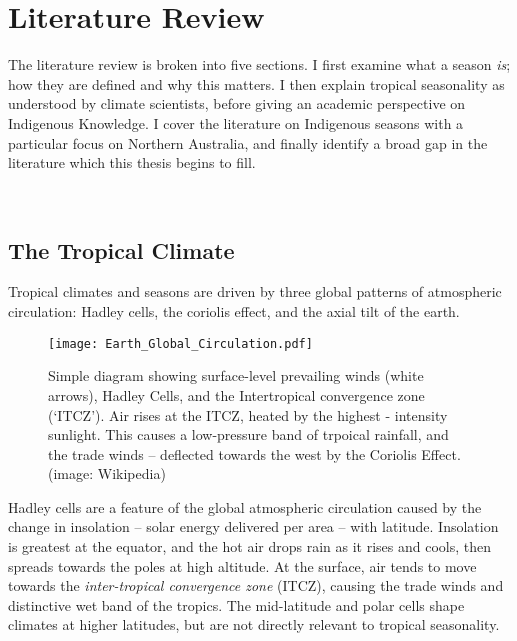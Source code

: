 \chapter{Literature Review}
\label{ch:lit-review}

The literature review is broken into five sections.  I first examine
what a season \emph{is}; how they are defined and why this matters.
I then explain tropical seasonality as understood by climate scientists,
before giving an academic perspective on Indigenous Knowledge.
I cover the literature on Indigenous seasons with a particular
focus on Northern Australia, and finally identify a broad gap in the
literature which this thesis begins to fill.


~\\




\section{The Tropical Climate}
\label{sec:lit-tropical-climate}

Tropical climates and seasons are driven by three global patterns of
atmospheric circulation:  Hadley cells, the coriolis effect, and the axial
tilt of the earth.

\begin{wrapfigure}{r}{0.6\textwidth}
    \centering
    \texttt{[image: Earth\_Global\_Circulation.pdf]}
    \caption[Hadley Cells and trade-winds]{
        Simple diagram showing surface-level prevailing winds (white arrows),
        Hadley Cells, and the Intertropical convergence zone (`ITCZ').
        Air rises at the ITCZ, heated by the highest - intensity sunlight.
        This causes a low-pressure band of trpoical rainfall, and the
        trade winds -- deflected towards the west by the Coriolis Effect.
        (image: Wikipedia)}
    \label{fig:hadley-cells}
\end{wrapfigure}

Hadley cells are a feature of the global atmospheric circulation
caused by the change in insolation -- solar energy delivered per area --
with latitude.  Insolation is greatest at the equator, and the hot air drops
rain as it rises and cools, then spreads towards the poles at high altitude.
At the surface, air tends to move towards the \textit{inter-tropical
convergence zone} (ITCZ), causing the trade winds and distinctive wet band
of the tropics.  The mid-latitude and polar cells shape climates at higher
latitudes, but are not directly relevant to tropical seasonality.

